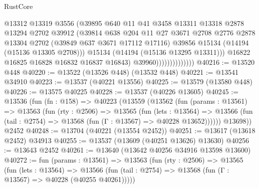 \begin{lexlean}{RustCore}
\begin{coremodule}
                                  @13312
                                  @13319
                                  @3556
                                  (@39895
                                    @640
                                    @11
                                    @41
                                    @3458
                                    @13311
                                    @13318
                                    @2878
                                    @13294
                                    @2702
                                    @39912
                                    (@39814
                                      @638
                                      @204
                                      @11
                                      @27
                                      @3671
                                      @2708
                                      @2776
                                      @2878
                                      @13304
                                      @2702
                                      (@39849 @637 @3671 @17112 @17116)
                                      @39856
                                      @15134
                                      (@14194 (@15136 @13305 @2708)))
                                    @15134
                                    (@14194 (@15136 @13295 @13311)))
                                  @16822
                                  @16825
                                  @16828
                                  @16832
                                  @16837
                                  @16843)
                                @39960))))))))))))))
@40216 := @13520 @448
@40220 := @13522 (@13526 @448) (@13532 @448)
@40221 := @13541 @34910
@40223 := @13537 (@40221 @13556)
@40225 := @13579 (@13580 @448)
@40226 := @13575 @40225
@40228 := @13537 (@40226 @13605)
@40245 := @13536
    (fun (fn : @158) =>
    @40223
      (@13559
        (@13562
          (fun (params : @13561) =>
          @13563
            (fun (rty : @2506) =>
            @13565
              (fun (lets : @13564) =>
              @13566 (fun (tail : @2754) => @13568 (fun (Γ : @13567) => @40228 @13652))))))
        @13698))
    @2452
@40248 := @13704 (@40221 (@13554 @2452))
@40251 := @13617 (@13618 @2452) @34913
@40255 := @13537 (@13609 (@40251 @13626) @13630)
@40256 := @13643 @2452
@40261 := @13640 (@13642 @40256 @34916 @13598 @13600)
@40272 := fun (params : @13561) =>
  @13563
    (fun (rty : @2506) =>
    @13565
      (fun (lets : @13564) =>
      @13566 (fun (tail : @2754) => @13568 (fun (Γ : @13567) => @40228 (@40255 @40261)))))

\end{coremodule}
\end{lexlean}
